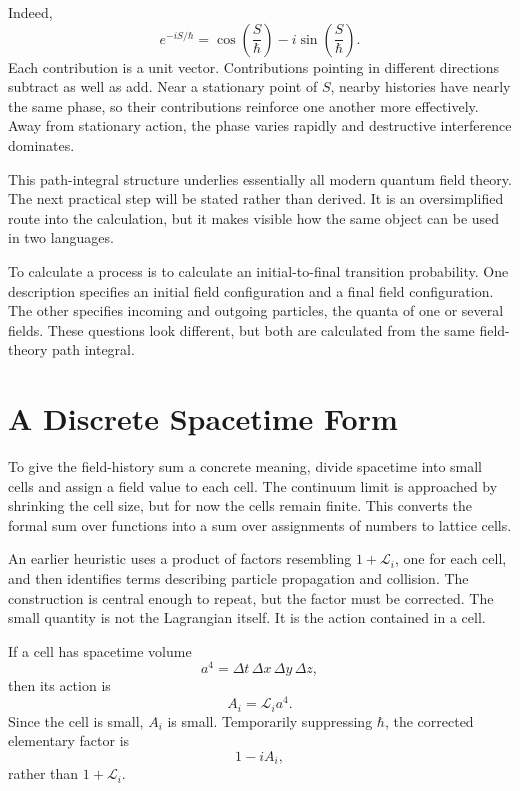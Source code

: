 Indeed,
\begin{equation}
e^{-iS/\hbar}
=
\cos\!\left(\frac{S}{\hbar}\right)
-i\sin\!\left(\frac{S}{\hbar}\right).
\end{equation}
Each contribution is a unit vector. Contributions pointing in different directions subtract as well as add. Near a stationary point of \(S\), nearby histories have nearly the same phase, so their contributions reinforce one another more effectively. Away from stationary action, the phase varies rapidly and destructive interference dominates.

This path-integral structure underlies essentially all modern quantum field theory. The next practical step will be stated rather than derived. It is an oversimplified route into the calculation, but it makes visible how the same object can be used in two languages.

To calculate a process is to calculate an initial-to-final transition probability. One description specifies an initial field configuration and a final field configuration. The other specifies incoming and outgoing particles, the quanta of one or several fields. These questions look different, but both are calculated from the same field-theory path integral.

\section{A Discrete Spacetime Form}

To give the field-history sum a concrete meaning, divide spacetime into small cells and assign a field value to each cell. The continuum limit is approached by shrinking the cell size, but for now the cells remain finite. This converts the formal sum over functions into a sum over assignments of numbers to lattice cells.

An earlier heuristic uses a product of factors resembling \(1+\mathcal{L}_i\), one for each cell, and then identifies terms describing particle propagation and collision. The construction is central enough to repeat, but the factor must be corrected. The small quantity is not the Lagrangian itself. It is the action contained in a cell.

If a cell has spacetime volume
\begin{equation}
a^4=\Delta t\,\Delta x\,\Delta y\,\Delta z,
\end{equation}
then its action is
\begin{equation}
A_i=\mathcal{L}_i a^4.
\end{equation}
Since the cell is small, \(A_i\) is small. Temporarily suppressing \(\hbar\), the corrected elementary factor is
\begin{equation}
1-iA_i,
\end{equation}
rather than \(1+\mathcal{L}_i\).

